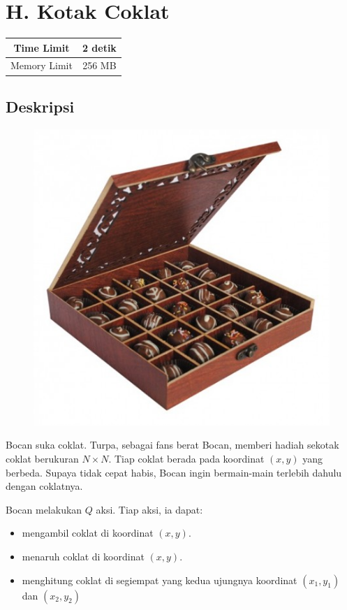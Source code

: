 \documentclass{article}
\begin{document}
\section*{\hfil H. Kotak Coklat\hfil}

\begin{center}
\begin{tabular}{ |cc| } 
 \hline
 Time Limit & 2 detik \\
 \hline 
 Memory Limit & 256 MB \\
 \hline
\end{tabular}
\end{center}

\subsection*{Deskripsi}

\begin{figure}[h!]
	\centering
	\includegraphics[width=0.5\linewidth]{box-of-chocolate}
\end{figure}

\par\noindent Bocan suka coklat. Turpa, sebagai fans berat Bocan, memberi hadiah sekotak coklat berukuran $N \times N$. Tiap coklat berada pada koordinat $(x,y)$ yang berbeda. Supaya tidak cepat habis, Bocan ingin bermain-main terlebih dahulu dengan coklatnya.

\par\noindent Bocan melakukan $Q$ aksi. Tiap aksi, ia dapat:

\begin{itemize}
	\item mengambil coklat di koordinat $(x,y)$.
	\item menaruh coklat di koordinat $(x,y)$.
	\item menghitung coklat di segiempat yang kedua ujungnya koordinat $(x_1,y_1)$ dan $(x_2,y_2)$
\end{itemize}
\end{document}
